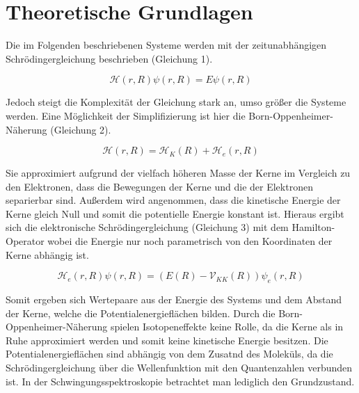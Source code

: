 


\section{Theoretische Grundlagen}

Die im Folgenden beschriebenen Systeme werden mit der zeitunabhängigen Schrödingergleichung beschrieben (Gleichung 1). 

\begin {equation}
\mathcal{H}\left(r,R\right)\psi\left(r,R\right)=E\psi\left(r,R\right)
\end {equation}

Jedoch steigt die Komplexität der Gleichung stark an, umso größer die Systeme werden. Eine Möglichkeit der Simplifizierung ist hier die Born-Oppenheimer-Näherung (Gleichung 2). 

\begin {equation}
\mathcal{H}\left(r,R\right)=\mathcal{H}_{K}\left(R\right)+\mathcal{H}_{e}\left(r,R\right)
\end {equation}

Sie approximiert aufgrund der vielfach höheren Masse der Kerne im Vergleich zu den Elektronen, dass die Bewegungen der Kerne und die der Elektronen separierbar sind. Außerdem wird angenommen, dass die kinetische Energie der Kerne gleich Null und somit die potentielle Energie konstant ist.
Hieraus ergibt sich die elektronische Schrödingergleichung (Gleichung 3) mit dem Hamilton-Operator wobei die Energie nur noch parametrisch von den Koordinaten der Kerne abhängig ist.

\begin {equation}
\mathcal{H}_e\left(r,R\right)\psi\left(r,R\right)=\left(E\left(R\right)-\mathcal{V}_{KK}\left(R\right)\right)\psi_e\left(r,R\right)
\end {equation}

 Somit ergeben sich Wertepaare aus der Energie des Systems und dem Abstand der Kerne, welche die Potentialenergieflächen bilden.
Durch die Born-Oppenheimer-Näherung spielen Isotopeneffekte keine Rolle, da die Kerne als in Ruhe approximiert werden und somit keine kinetische Energie besitzen.
Die Potentialenergieflächen sind abhängig von dem Zusatnd des Moleküls, da die Schrödingergleichung über die Wellenfunktion mit den Quantenzahlen verbunden ist. In der Schwingungsspektroskopie betrachtet man lediglich den Grundzustand.


